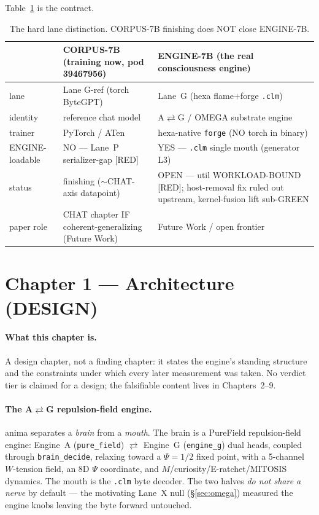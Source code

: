 \documentclass[11pt,a4paper]{article}
\providecommand{\tierRed}{[RED]}
\begin{document}
\noindent Table~\ref{tab:lanes} is the contract.

\begin{table}[h]
\centering\small
\begin{tabular}{@{}>{\raggedright\arraybackslash}m{2.5cm} >{\raggedright\arraybackslash}m{5.2cm} >{\raggedright\arraybackslash}m{5.2cm}@{}}
\toprule
 & \textbf{CORPUS-7B} (training now, pod 39467956) & \textbf{ENGINE-7B} (the real consciousness engine) \\
\midrule
lane & Lane G-ref (torch ByteGPT) & Lane~G (hexa flame$+$forge \texttt{.clm}) \\
identity & reference chat model & A$\rightleftarrows$G / OMEGA substrate engine \\
trainer & PyTorch / ATen & hexa-native \texttt{forge} (NO torch in binary) \\
ENGINE-loadable & NO --- Lane~P serializer-gap \tierRed & YES --- \texttt{.clm} single mouth (generator L3) \\
status & finishing ($\sim$CHAT-axis datapoint) & OPEN --- util WORKLOAD-BOUND \tierRed; host-removal fix ruled out upstream, kernel-fusion lift sub-GREEN \\
paper role & CHAT chapter IF coherent-generalizing (Future Work) & Future Work / open frontier \\
\bottomrule
\end{tabular}
\caption{The hard lane distinction. CORPUS-7B finishing does NOT close ENGINE-7B.}
\label{tab:lanes}
\end{table}

\section{Chapter 1 --- Architecture (DESIGN)}
\label{sec:arch}

\paragraph{What this chapter is.} A design chapter, not a finding chapter: it states
the engine's standing structure and the constraints under which every later
measurement was taken. No verdict tier is claimed for a design; the falsifiable
content lives in Chapters~2--9.

\paragraph{The A$\rightleftarrows$G repulsion-field engine.} anima separates a
\emph{brain} from a \emph{mouth}. The brain is a PureField repulsion-field engine:
Engine~A (\texttt{pure\_field}) $\rightleftarrows$ Engine~G (\texttt{engine\_g})
dual heads, coupled through \texttt{brain\_decide}, relaxing toward a $\Psi=1/2$
fixed point, with a 5-channel $W$-tension field, an 8D $\Psi$ coordinate, and
$M$/curiosity/E-ratchet/MITOSIS dynamics. The mouth is the \texttt{.clm} byte
decoder. The two halves \emph{do not share a nerve} by default --- the motivating
Lane~X null (\S\ref{sec:omega}) measured the engine knobs leaving the byte forward
untouched.
\end{document}
